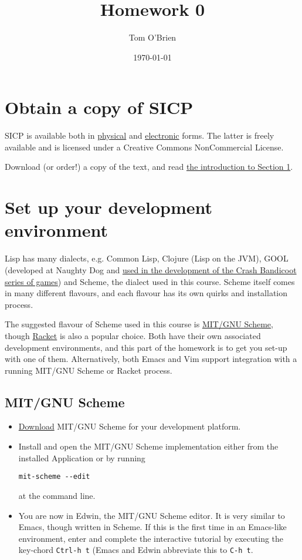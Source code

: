 \documentclass[11pt]{article}
\author{Tom O'Brien}
\date{\today}
\title{Homework 0}
\begin{document}
\maketitle
\section{Obtain a copy of SICP}
\label{sec-1}
SICP is available both in \href{http://www.amazon.co.uk/Structure-Interpretation-Computer-Electrical-Engineering/dp/0262510871/ref%3Dsr_1_1?ie%3DUTF8&qid%3D1385586049&sr%3D8-1&keywords%3Dstructure%2Band%2Binterpretation%2Bof%2Bcomputer%2Bprograms}{physical} and \href{https://mitpress.mit.edu/sicp/full-text/book/book.html}{electronic} forms.  The latter
is freely available and is licensed under a Creative Commons
NonCommercial License.

Download (or order!) a copy of the text, and read \href{https://mitpress.mit.edu/sicp/full-text/book/book-Z-H-9.html#%25_chap_1}{the introduction to Section 1}.

\section{Set up your development environment}
\label{sec-2}
Lisp has many dialects, e.g. Common Lisp, Clojure (Lisp on the JVM), GOOL
(developed at Naughty Dog and \href{http://all-things-andy-gavin.com/2011/03/12/making-crash-bandicoot-gool-part-9/}{used in the development of the Crash Bandicoot series of games})
and Scheme, the dialect used in this course.  Scheme itself comes in many different flavours,
and each flavour has its own quirks and installation process.

The suggested flavour of Scheme used in this course is \href{https://www.gnu.org/software/mit-scheme/}{MIT/GNU Scheme}, though \href{http://racket-lang.org/}{Racket} is also
a popular choice.  Both have their own associated development environments,
and this part of the homework is to get you set-up with one of them.  Alternatively,
both Emacs and Vim support integration with a running MIT/GNU Scheme or Racket process.
\subsection{MIT/GNU Scheme}
\label{sec-2-1}
\begin{itemize}
\item \href{https://www.gnu.org/software/mit-scheme/}{Download} MIT/GNU Scheme for your development platform.
\item Install and open the MIT/GNU Scheme implementation either from
the installed Application or by running
\begin{verbatim}
mit-scheme --edit
\end{verbatim}
at the command line.
\item You are now in Edwin, the MIT/GNU Scheme editor. It is very
similar to Emacs, though written in Scheme.  If this is the first
time in an Emacs-like environment, enter and complete the
interactive tutorial by executing the key-chord \texttt{Ctrl-h t} (Emacs
and Edwin abbreviate this to \texttt{C-h t}.
\end{itemize}
\end{document}
